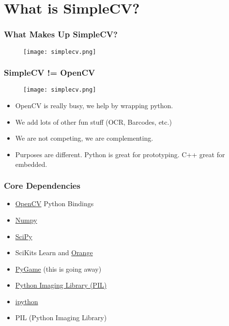 \documentclass[compress]{beamer}
\begin{document}
\section{What is SimpleCV?} %

\begin{frame}
\frametitle{What Makes Up SimpleCV?}
\begin{figure}
\texttt{[image: simplecv.png]}
\end{figure}
\end{frame}


\begin{frame}
\frametitle{SimpleCV != OpenCV }
\begin{figure}
  \texttt{[image: simplecv.png]}
\end{figure}
\begin{itemize}
  \item OpenCV is really busy, we help by wrapping python.
  \item We add lots of other fun stuff (OCR, Barcodes, etc.)
  \item We are not competing, we are complementing. 
  \item Purposes are different. Python is great for prototyping. C++ great for embedded.
\end{itemize}
\end{frame}


\begin{frame}
  \frametitle{Core Dependencies}
  \begin{itemize}
  \item \href{http://www.opencv.org}{OpenCV} Python Bindings
  \item \href{http://docs.scipy.org/doc/}{Numpy}
  \item \href{http://docs.scipy.org/doc/}{SciPy}
  \item SciKits Learn and \href{http://orange.biolab.si/}{Orange}
  \item \href{http://www.pygame.org}{PyGame} (this is going away)
  \item \href{http://www.pythonware.com/products/pil/}{Python Imaging Library (PIL)}
  \item \href{http://ipython.org/}{ipython}
  \item PIL (Python Imaging Library)
  \end{itemize}
\end{frame}
\end{document}
